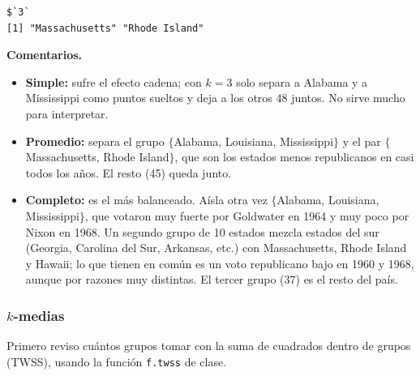\documentclass[11pt]{article}\usepackage[]{graphicx}\usepackage[]{xcolor}
\makeatletter
\newenvironment{kframe}{%
 \def\at@end@of@kframe{}%
 \ifinner\ifhmode%
  \def\at@end@of@kframe{\end{minipage}}%
  \begin{minipage}{\columnwidth}%
 \fi\fi%
 \def\FrameCommand##1{\hskip\@totalleftmargin \hskip-\fboxsep
 \colorbox{shadecolor}{##1}\hskip-\fboxsep
     \hskip-\linewidth \hskip-\@totalleftmargin \hskip\columnwidth}%
 \MakeFramed {\advance\hsize-\width
   \@totalleftmargin\z@ \linewidth\hsize
   \@setminipage}}%
 {\par\unskip\endMakeFramed%
 \at@end@of@kframe}
\newenvironment{knitrout}{}{} %
\makeatother
\begin{document}
\begin{knitrout}
\begin{kframe}
\begin{verbatim}
$`3`
[1] "Massachusetts" "Rhode Island" 
\end{verbatim}
\end{kframe}
\end{knitrout}

\textbf{Comentarios.}
\begin{itemize}[leftmargin=*]
\item \textbf{Simple:} sufre el efecto cadena; con $k=3$ solo separa a Alabama y a Mississippi como puntos sueltos y deja a los otros 48 juntos. No sirve mucho para interpretar.
\item \textbf{Promedio:} separa el grupo $\{$Alabama, Louisiana, Mississippi$\}$ y el par $\{$Massachusetts, Rhode Island$\}$, que son los estados menos republicanos en casi todos los años. El resto (45) queda junto.
\item \textbf{Completo:} es el más balanceado. Aísla otra vez $\{$Alabama, Louisiana, Mississippi$\}$, que votaron muy fuerte por Goldwater en 1964 y muy poco por Nixon en 1968. Un segundo grupo de 10 estados mezcla estados del sur (Georgia, Carolina del Sur, Arkansas, etc.) con Massachusetts, Rhode Island y Hawaii; lo que tienen en común es un voto republicano bajo en 1960 y 1968, aunque por razones muy distintas. El tercer grupo (37) es el resto del país.
\end{itemize}

\subsubsection*{$k$-medias}

Primero reviso cuántos grupos tomar con la suma de cuadrados dentro de grupos (TWSS), usando la función \texttt{f.twss} de clase.
\end{document}
